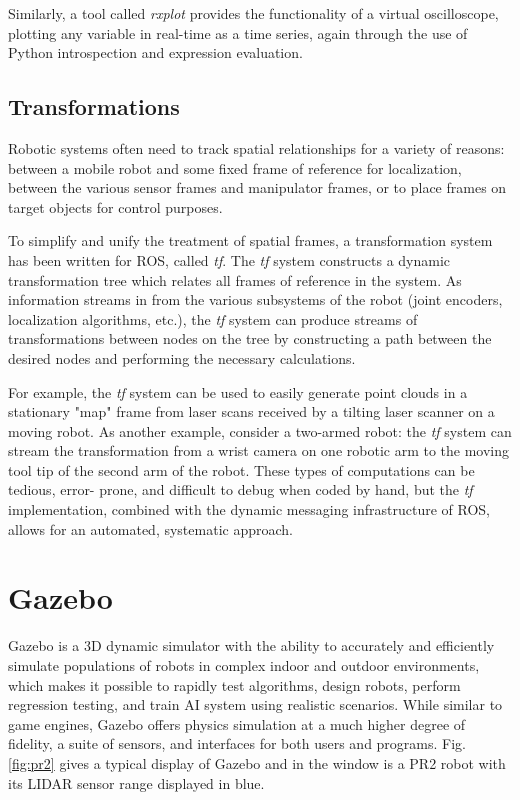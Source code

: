 Similarly, a tool called \textit{rxplot} provides the functionality of a virtual oscilloscope, plotting any variable in real-time as a time series, again through the use of Python introspection and expression evaluation.

\subsection{Transformations}

Robotic systems often need to track spatial relationships for a variety of reasons: between a mobile robot and some fixed frame of reference for localization, between the various sensor frames and manipulator frames, or to place frames on target objects for control purposes.

To simplify and unify the treatment of spatial frames, a transformation system has been written for ROS, called \textit{tf}. The \textit{tf} system constructs a dynamic transformation tree which relates all frames of reference in the system. As information streams in from the various subsystems of the robot (joint encoders, localization algorithms, etc.), the \textit{tf} system can produce streams of transformations between nodes on the tree by constructing a path between the desired nodes and performing the necessary calculations.

For example, the \textit{tf} system can be used to easily generate point clouds in a stationary "map" frame from laser scans received by a tilting laser scanner on a moving robot. As another example, consider a two-armed robot: the \textit{tf} system can stream the transformation from a wrist camera on one robotic arm to the moving tool tip of the second arm of the robot. These types of computations can be tedious, error- prone, and difficult to debug when coded by hand, but the \textit{tf} implementation, combined with the dynamic messaging infrastructure of ROS, allows for an automated, systematic approach.

\section{Gazebo}

Gazebo is a 3D dynamic simulator with the ability to accurately and efficiently simulate populations of robots in complex indoor and outdoor environments, which makes it possible to rapidly test algorithms, design robots, perform regression testing, and train AI system using realistic scenarios. While similar to game engines, Gazebo offers physics simulation at a much higher degree of fidelity, a suite of sensors, and interfaces for both users and programs. Fig. \ref{fig:pr2} gives a typical display of Gazebo and in the window is a PR2 robot \cite{PR2008} with its LIDAR sensor range displayed in blue.

